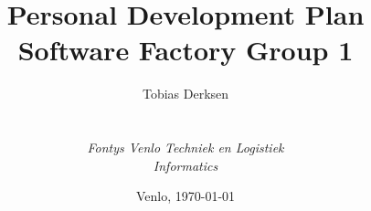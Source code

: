 
\def\Company{\textit{FSG1 - Fontys SoFa Group 1}}
\def\Institute{\textit{Fontys Venlo Techniek en Logistiek}}
\def\Course{\textit{Informatics}}

\def\BoldTitle{Personal Development Plan}
\def\Subtitle{Software Factory Group 1}
\def\Authors{Tobias Derksen}


\title{\textbf{\BoldTitle}\\\Subtitle}
\author{\Authors \\ \\ \\ \Institute\\ \Course}
\date{Venlo, \today}
